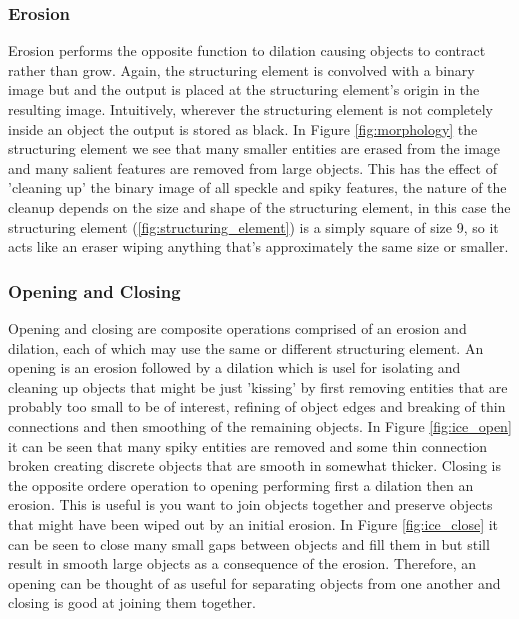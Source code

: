 \subsubsection{Erosion}

Erosion performs the opposite function to dilation causing objects to contract rather than grow. Again, the structuring element is convolved with a binary image but and the output is placed at the structuring element's origin in the resulting image. Intuitively, wherever the structuring element is not completely inside an object the output is stored as black. In Figure \ref{fig:morphology} the structuring element we see that many smaller entities are erased from the image and many salient features are removed from large objects. This has the effect of 'cleaning up' the binary image of all speckle and spiky features, the nature of the cleanup depends on the size and shape of the structuring element, in this case the structuring element (\ref{fig:structuring_element}) is a simply square of size 9, so it acts like an eraser wiping anything that's approximately the same size or smaller.


\subsubsection{Opening and Closing}

Opening and closing are composite operations comprised of an erosion and dilation, each of which may use the same or different structuring element. An opening is an erosion followed by a dilation which is usel for isolating and cleaning up objects that might be just 'kissing' by first removing entities that are probably too small to be of interest, refining of object edges and breaking of thin connections and then smoothing of the remaining objects. In Figure \ref{fig:ice_open} it can be seen that many spiky entities are removed and some thin connection broken creating discrete objects that are smooth in somewhat thicker. Closing is the opposite ordere operation to opening performing first a dilation then an erosion. This is useful is you want to join objects together and preserve objects that might have been wiped out by an initial erosion. In Figure \ref{fig:ice_close} it can be seen to close many small gaps between objects and fill them in but still result in smooth large objects as a consequence of the erosion. Therefore, an opening can be thought of as useful for separating objects from one another and closing is good at joining them together. 

